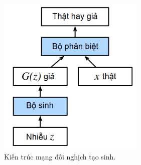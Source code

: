 \documentclass[a4paper, 12pt]{article}
\begin{document}
\begin{figure}[!h]
\captionsetup{width=0.8\textwidth}
\centering
\includegraphics[width=7cm]{images/2_71.PNG}
\caption{Kiến trúc mạng đối nghịch tạo sinh.}
\end{figure}
\end{document}
